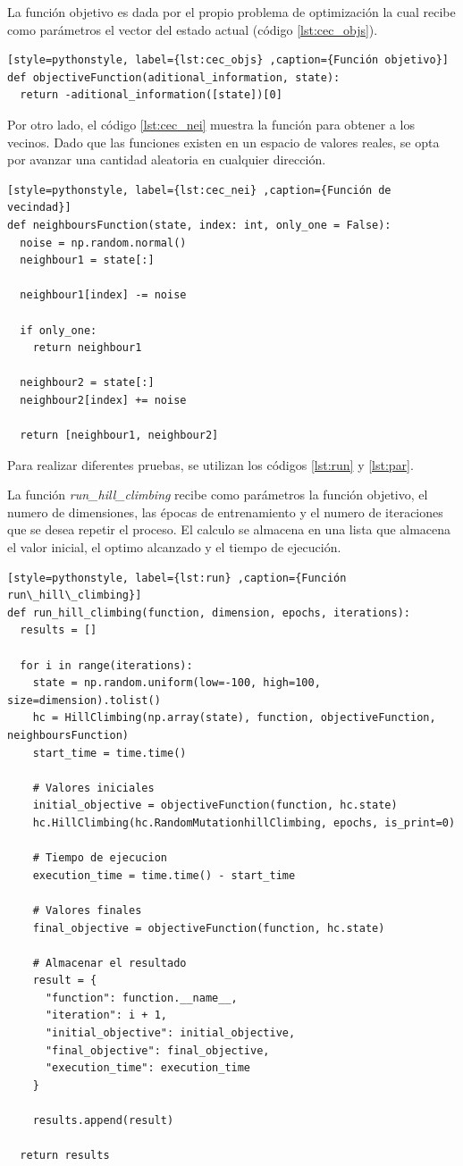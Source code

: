 \documentclass[12pt,twoside]{article}
\begin{document}
La función objetivo es dada por el propio problema de optimización la cual recibe como parámetros el vector del estado actual (código \ref{lst:cec_objs}).

\begin{lstlisting}[style=pythonstyle, label={lst:cec_objs} ,caption={Función objetivo}]
def objectiveFunction(aditional_information, state):
  return -aditional_information([state])[0]
\end{lstlisting}

Por otro lado, el código \ref{lst:cec_nei} muestra la función para obtener a los vecinos. Dado que las funciones existen en un espacio de valores reales, se opta por avanzar una cantidad aleatoria en cualquier dirección.

\begin{lstlisting}[style=pythonstyle, label={lst:cec_nei} ,caption={Función de vecindad}]
def neighboursFunction(state, index: int, only_one = False):
  noise = np.random.normal()
  neighbour1 = state[:]

  neighbour1[index] -= noise

  if only_one:
    return neighbour1

  neighbour2 = state[:]
  neighbour2[index] += noise

  return [neighbour1, neighbour2]
\end{lstlisting}

Para realizar diferentes pruebas, se utilizan los códigos \ref{lst:run} y \ref{lst:par}. 

La función \textit{run\_hill\_climbing} recibe como parámetros la función objetivo, el numero de dimensiones, las épocas de entrenamiento y el numero de iteraciones que se desea repetir el proceso. El calculo se almacena en una lista que almacena el valor inicial, el optimo alcanzado y el tiempo de ejecución.

\begin{lstlisting}[style=pythonstyle, label={lst:run} ,caption={Función run\_hill\_climbing}]
def run_hill_climbing(function, dimension, epochs, iterations):
  results = []

  for i in range(iterations):
    state = np.random.uniform(low=-100, high=100, size=dimension).tolist()
    hc = HillClimbing(np.array(state), function, objectiveFunction, neighboursFunction)
    start_time = time.time()

    # Valores iniciales
    initial_objective = objectiveFunction(function, hc.state)
    hc.HillClimbing(hc.RandomMutationhillClimbing, epochs, is_print=0)

    # Tiempo de ejecucion    
    execution_time = time.time() - start_time

    # Valores finales
    final_objective = objectiveFunction(function, hc.state)

    # Almacenar el resultado
    result = {
	  "function": function.__name__,
	  "iteration": i + 1,
	  "initial_objective": initial_objective,
	  "final_objective": final_objective,
	  "execution_time": execution_time  
    }

    results.append(result)

  return results
\end{lstlisting}
\end{document}
